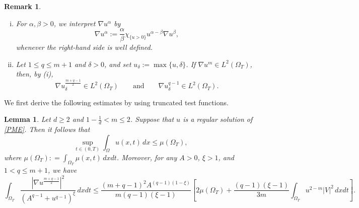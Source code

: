 \documentclass{amsart}
\newtheorem{lemma}[defn]{Lemma}
\newtheorem{remark}[defn]{Remark}
\numberwithin{equation}{section}
\begin{document}
\begin{remark}
\begin{enumerate}[(i)]
  \item For $\alpha,\beta>0$, we interpret $\nabla u^\alpha$ by
  \[
  \nabla u^\alpha
  :=
  \frac{\alpha}{\beta}\chi_{\{u>0\}}u^{\alpha-\beta}\nabla u^\beta,
  \]
  whenever the right-hand side is well defined.
  \item Let $1 \le q \le m+1$ and $\delta>0$, and set $u_\delta := \max\{u, \delta\}$. If $\nabla u^m \in L^2(\Omega_T)$, then, by (i),
  \[
  \nabla u_\delta^{\frac{m+q-1}{2}} \in L^2(\Omega_T)
  \qquad\text{and}\qquad
  \nabla u_\delta^{q-1} \in L^2(\Omega_T).
  \]
\end{enumerate}
\end{remark}







We first derive the following estimates by using truncated test functions.
\begin{lemma}\label{L1}
Let $d\geq 2$ and $1-\frac{1}{d} < m \leq 2$.
Suppose that $u$ is a regular solution of \eqref{PME}.
Then it follows that
\begin{equation}\label{Estimate01}
	\sup_{t\in (0, T)} \int_{\Omega} u(x, t) \,dx \leq \mu (\Omega_{T}),
\end{equation}
where $\mu(\Omega_T): = \int_{\Omega_T} \mu(x,t) \, dxdt$. 
Moreover, for any $A>0$, $\xi > 1$, and $1 < q \le m+1$, we have
\begin{equation}\label{Estimate02}
	\int_{\Omega_T} \frac{\left|\nabla u^{\frac{m+q-1}{2}}\right|^2}{\left(A^{q-1} + u^{q-1}\right)^{\xi}} \,dxdt		
	\leq \frac{(m+q-1)^2 A^{(q-1)(1-\xi)}}{m(q-1)(\xi-1)} \left[ 2\mu(\Omega_{T}) + \frac{(q-1)(\xi-1)}{3m}\int_{\Omega_T} u^{2-m} |V|^2 \,dxdt\right].
\end{equation}
\end{lemma}
\end{document}

